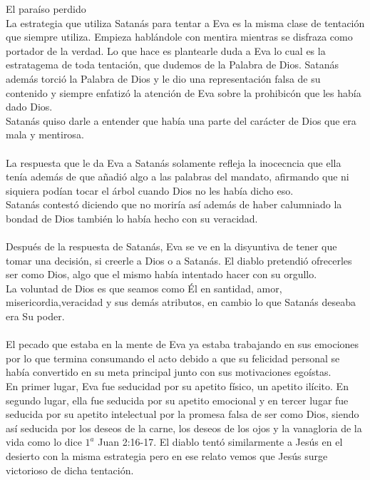 \begin{section}{El paraíso perdido}
	\\
	La estrategia que utiliza Satanás para tentar a Eva es la misma clase de tentación que siempre utiliza. Empieza hablándole con mentira mientras se disfraza como portador de la verdad. Lo que hace es plantearle duda a Eva lo cual es la estratagema de toda tentación, que dudemos de la Palabra de Dios. Satanás además torció la Palabra de Dios y le dio una representación falsa de su contenido y siempre enfatizó la atención de Eva sobre la prohibicón que les había dado Dios.\\
	Satanás quiso darle a entender que había una parte del carácter de Dios que era mala y mentirosa.\\
	\\
	La respuesta que le da Eva a Satanás solamente refleja la inocecncia que ella tenía además de que añadió algo a las palabras del mandato, afirmando que ni siquiera podían tocar el árbol cuando Dios no les había dicho eso.\\
	Satanás contestó diciendo que no moriría así además de haber calumniado la bondad de Dios también lo había hecho con su veracidad.\\
	\\
	Después de la respuesta de Satanás, Eva se ve en la disyuntiva de tener que tomar una decisión, si creerle a Dios o a Satanás. El diablo pretendió ofrecerles ser como Dios, algo que el mismo había intentado hacer con su orgullo.\\
	La voluntad de Dios es que seamos como Él en santidad, amor, misericordia,veracidad y sus demás atributos, en cambio lo que Satanás deseaba era Su poder.\\
	\\
	El pecado que  estaba en la mente de Eva ya estaba trabajando en sus emociones por lo que termina consumando el acto debido a que su felicidad personal se había convertido en su meta principal junto con sus motivaciones egoístas.\\
	En primer lugar, Eva fue seducidad por su apetito físico, un apetito ilícito. En segundo lugar, ella fue seducida por su apetito emocional y en tercer lugar fue seducida por su apetito intelectual por la promesa falsa de ser como Dios, siendo así seducida por los deseos de la carne, los deseos de los ojos y la vanagloria de la vida como lo dice $1^{a}$ Juan 2:16-17. El diablo tentó similarmente a Jesús en el desierto con la misma estrategia pero en ese relato vemos que Jesús surge victorioso de dicha tentación.\\
	\\

\end{section}
